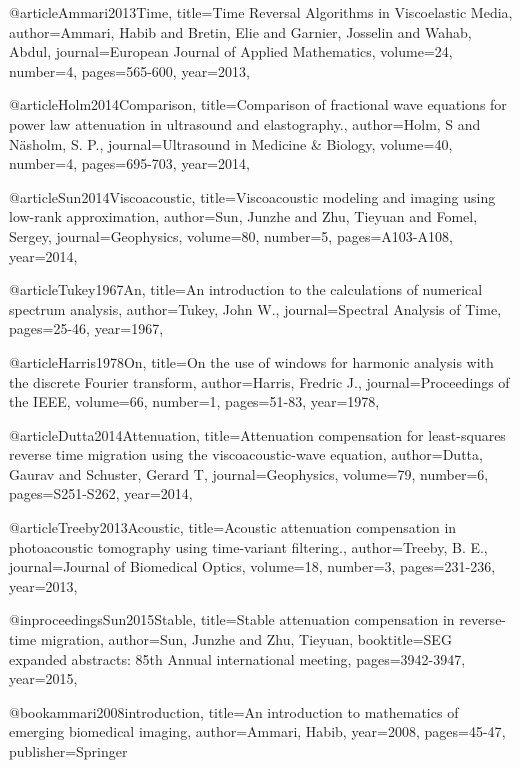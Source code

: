 {@article{Ammari2013Time,
  title={Time Reversal Algorithms in Viscoelastic Media},
  author={Ammari, Habib and Bretin, Elie and Garnier, Josselin and Wahab, Abdul},
  journal={European Journal of Applied Mathematics},
  volume={24},
  number={4},
  pages={565-600},
  year={2013},
}

@article{Holm2014Comparison,
  title={Comparison of fractional wave equations for power law attenuation in ultrasound and elastography.},
  author={Holm, S and Näsholm, S. P.},
  journal={Ultrasound in Medicine \& Biology},
  volume={40},
  number={4},
  pages={695-703},
  year={2014},
}

@article{Sun2014Viscoacoustic,
  title={Viscoacoustic modeling and imaging using low-rank approximation},
  author={Sun, Junzhe and Zhu, Tieyuan and Fomel, Sergey},
  journal={Geophysics},
  volume={80},
  number={5},
  pages={A103-A108},
  year={2014},
}

@article{Tukey1967An,
  title={An introduction to the calculations of numerical spectrum analysis},
  author={Tukey, John W.},
  journal={Spectral Analysis of Time},
  pages={25-46},
  year={1967},
}

@article{Harris1978On,
  title={On the use of windows for harmonic analysis with the discrete {F}ourier transform},
  author={Harris, Fredric J.},
  journal={Proceedings of the IEEE},
  volume={66},
  number={1},
  pages={51-83},
  year={1978},
}

@article{Dutta2014Attenuation,
  title={Attenuation compensation for least-squares reverse time migration using the viscoacoustic-wave equation},
  author={Dutta, Gaurav and Schuster, Gerard T},
  journal={Geophysics},
  volume={79},
  number={6},
  pages={S251-S262},
  year={2014},
}

@article{Treeby2013Acoustic,
  title={Acoustic attenuation compensation in photoacoustic tomography using time-variant filtering.},
  author={Treeby, B. E.},
  journal={Journal of Biomedical Optics},
  volume={18},
  number={3},
  pages={231-236},
  year={2013},
}

@inproceedings{Sun2015Stable,
  title={Stable attenuation compensation in reverse-time migration},
  author={Sun, Junzhe and Zhu, Tieyuan},
  booktitle={SEG expanded abstracts: 85th Annual international meeting},
  pages={3942-3947},
  year={2015},
}

@book{ammari2008introduction,
  title={An introduction to mathematics of emerging biomedical imaging},
  author={Ammari, Habib},
  year={2008},
  pages={45-47},
  publisher={Springer}
}


}
